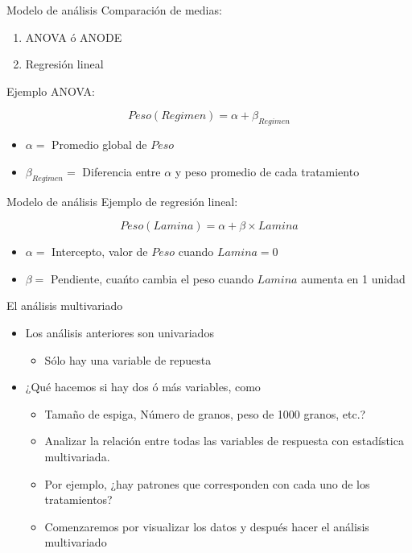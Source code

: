 \documentclass[
  11pt,
  ignorenonframetext,
]{beamer}
\providecommand{\tightlist}{%
  \setlength{\itemsep}{0pt}\setlength{\parskip}{0pt}}
\begin{document}
\begin{frame}{Modelo de análisis}
\protect\hypertarget{modelo-de-anuxe1lisis}{}
Comparación de medias:

\begin{enumerate}
\tightlist
\item
  ANOVA ó ANODE
\item
  Regresión lineal
\end{enumerate}

Ejemplo ANOVA:

\[ Peso(Regimen) =  \alpha + \beta_{Regimen} \]

\begin{itemize}
\tightlist
\item
  \(\alpha =\) Promedio global de \(Peso\)
\item
  \(\beta_{Regímen} =\) Diferencia entre \(\alpha\) y peso promedio de
  cada tratamiento
\end{itemize}
\end{frame}

\begin{frame}{Modelo de análisis}
\protect\hypertarget{modelo-de-anuxe1lisis-1}{}
Ejemplo de regresión lineal:

\[ Peso(Lamina) = \alpha + \beta \times Lamina \]

\begin{itemize}
\tightlist
\item
  \(\alpha =\) Intercepto, valor de \(Peso\) cuando \(Lamina = 0\)
\item
  \(\beta =\) Pendiente, cuańto cambia el peso cuando \(Lamina\) aumenta
  en 1 unidad
\end{itemize}
\end{frame}

\begin{frame}{El análisis multivariado}
\protect\hypertarget{el-anuxe1lisis-multivariado}{}
\begin{itemize}
\item
  Los análisis anteriores son univariados

  \begin{itemize}
  \tightlist
  \item
    Sólo hay una variable de repuesta
  \end{itemize}
\item
  ¿Qué hacemos si hay dos ó más variables, como

  \begin{itemize}
  \tightlist
  \item
    Tamaño de espiga, Número de granos, peso de 1000 granos, etc.?
  \item
    Analizar la relación entre todas las variables de respuesta con
    estadística multivariada.
  \item
    Por ejemplo, ¿hay patrones que corresponden con cada uno de los
    tratamientos?
  \item
    Comenzaremos por visualizar los datos y después hacer el análisis
    multivariado
  \end{itemize}
\end{itemize}
\end{frame}
\end{document}
